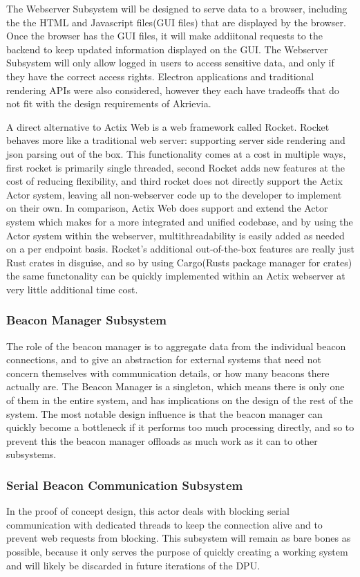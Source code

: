\bigskip
The Webserver Subsystem will be designed to serve data to a browser, including the the HTML and Javascript files(GUI files) that are displayed by the browser.
Once the browser has the GUI files, it will make addiitonal requests to the backend to keep updated information displayed on the GUI.
The Webserver Subsystem will only allow logged in users to access sensitive data, and only if they have the correct access rights.
Electron applications and traditional rendering APIs were also considered, however they each have tradeoffs that do not fit with the design requirements of Akrievia.

\bigskip
A direct alternative to Actix Web is a web framework called Rocket.
Rocket behaves more like a traditional web server: supporting server side rendering and json parsing out of the box.
This functionality comes at a cost in multiple ways, first rocket is primarily single threaded, second Rocket adds new features at the cost of reducing flexibility, and third rocket does not directly support the Actix Actor system, leaving all non-webserver code up to the developer to implement on their own.
In comparison, Actix Web does support and extend the Actor system which makes for a more integrated and unified codebase, and by using the Actor system within the webserver, multithreadability is easily added as needed on a per endpoint basis.
Rocket's additional out-of-the-box features are really just Rust crates in disguise, and so by using Cargo(Rusts package manager for crates) the same functonality can be quickly implemented within an Actix webserver at very little additional time cost.

\bigskip
\subsubsection{Beacon Manager Subsystem}
The role of the beacon manager is to aggregate data from the individual beacon connections, and to give an abstraction for external systems that need not concern themselves with communication details, or how many beacons there actually are.
The Beacon Manager is a singleton, which means there is only one of them in the entire system, and has implications on the design of the rest of the system.
The most notable design influence is that the beacon manager can quickly become a bottleneck if it performs too much processing directly, and so to prevent this the beacon manager offloads as much work as it can to other subsystems.

\bigskip
\subsubsection{Serial Beacon Communication Subsystem}
In the proof of concept design, this actor deals with blocking serial communication with dedicated threads to keep the connection alive and to prevent web requests from blocking.
This subsystem will remain as bare bones as possible, because it only serves the purpose of quickly creating a working system and will likely be discarded in future iterations of the DPU.


